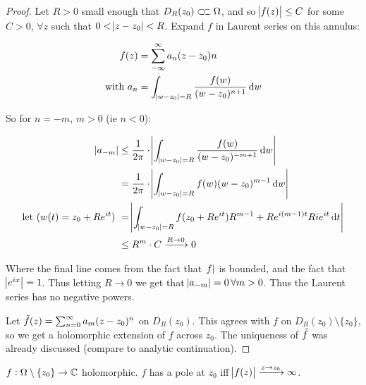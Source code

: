 \begin{proof}
Let $R>0$ small enough that $D_R(z_0) \ssubset \om$, and so $\abs{f(z) } \leq C$ for some $C>0$, $\forall z$ such that $0 < \abs{z-z_0} < R$. Expand $f$ in Laurent series on this annulus:

\begin{align*}
    f(z) &= \sum_{-\infty}^\infty a_n (z-z_0)n\\
    \text{with } a_n &= \int_{\abs{w-z_0} = R} \frac{f(w)}{(w-z_0)^{n+1}} \dif w
\end{align*}

So for $n = -m$, $m > 0$ (ie $n<0$):

\begin{align*}
    \abs{a_{-m}} &\leq \frac{1}{2 \pi } \cdot \abs{\int_{\abs{w-z_0} =R} \frac{f(w)}{(w-z_0)^{-m+1}}  \dif w}\\
    &= \frac{1}{2 \pi } \cdot \abs{\int_{\abs{w-z_0} =R} f(w)(w-z_0)^{m-1}  \dif w}\\
    \text{let ($w(t) = z_0 +Re^{it}$) } &= \abs{\int_{\abs{w-z_0} =R} f(z_0 +Re^{it})R^{m-1} +Re^{i(m-1)t} Ri e^{it}  \dif t}\\
    &\leq R^m \cdot C \xrightarrow[]{R\to 0} 0
\end{align*}

Where the final line comes from the fact that $\abs{f}$ is bounded, and the fact that $\abs{e^{ix}} = 1$. Thus letting $R \to 0$ we get that $\abs{a_{-m}} = 0 \, \forall m>0$. Thus the Laurent series has no negative powers.

Let $\Tilde{f}(z) = \sum_{n=0}^\infty a_m (z-z_0)^n$ on $D_R(z_0)$. This agrees with $f$ on $D_R(z_0) \setminus \{ z_0 \}$, so we get a holomorphic extension of $f$ across $z_0$. The uniqueness of $\Tilde{f}$ was already discussed (compare to analytic continuation).

\end{proof}

\begin{corollary}
$f: \Omega \setminus \{ z_0 \} \to \mathbb{C}$ holomorphic. $f$ has a pole at $z_0$ iff $\abs{f(z)} \xrightarrow[]{z \to z_0} \infty$.
\end{corollary}

